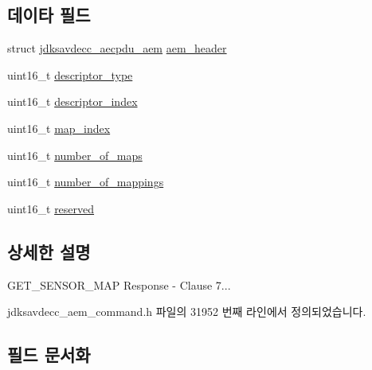 \subsection*{데이타 필드}
\begin{DoxyCompactItemize}
\item 
struct \hyperlink{structjdksavdecc__aecpdu__aem}{jdksavdecc\+\_\+aecpdu\+\_\+aem} \hyperlink{structjdksavdecc__aem__command__get__sensor__map__response_ae1e77ccb75ff5021ad923221eab38294}{aem\+\_\+header}
\item 
uint16\+\_\+t \hyperlink{structjdksavdecc__aem__command__get__sensor__map__response_ab7c32b6c7131c13d4ea3b7ee2f09b78d}{descriptor\+\_\+type}
\item 
uint16\+\_\+t \hyperlink{structjdksavdecc__aem__command__get__sensor__map__response_a042bbc76d835b82d27c1932431ee38d4}{descriptor\+\_\+index}
\item 
uint16\+\_\+t \hyperlink{structjdksavdecc__aem__command__get__sensor__map__response_a3a5e0547986898ad64c07f238d8b7bcf}{map\+\_\+index}
\item 
uint16\+\_\+t \hyperlink{structjdksavdecc__aem__command__get__sensor__map__response_a6d00316ed943197ab46c0af22c1d430a}{number\+\_\+of\+\_\+maps}
\item 
uint16\+\_\+t \hyperlink{structjdksavdecc__aem__command__get__sensor__map__response_ac7db472c5622ef473d5d0a5c416d5531}{number\+\_\+of\+\_\+mappings}
\item 
uint16\+\_\+t \hyperlink{structjdksavdecc__aem__command__get__sensor__map__response_a5a6ed8c04a3db86066924b1a1bf4dad3}{reserved}
\end{DoxyCompactItemize}


\subsection{상세한 설명}
G\+E\+T\+\_\+\+S\+E\+N\+S\+O\+R\+\_\+\+M\+AP Response -\/ Clause 7... 

jdksavdecc\+\_\+aem\+\_\+command.\+h 파일의 31952 번째 라인에서 정의되었습니다.



\subsection{필드 문서화}
